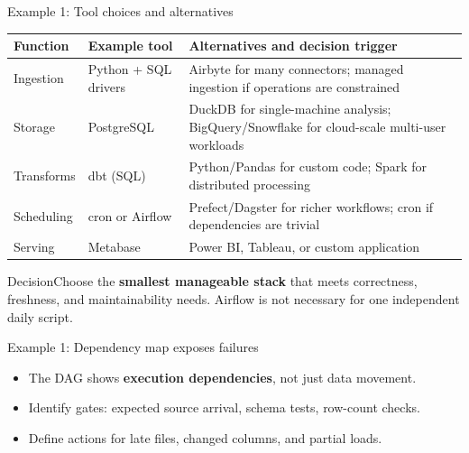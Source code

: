 \documentclass[aspectratio=43,10pt]{beamer}
\begin{document}
\begin{frame}{Example 1: Tool choices and alternatives}
\small
\begin{tabularx}{\textwidth}{@{}p{2.1cm}p{3.0cm}X@{}}\toprule
Function & Example tool & Alternatives and decision trigger \\ \midrule
Ingestion & Python + SQL drivers & Airbyte for many connectors; managed ingestion if operations are constrained \\
Storage & PostgreSQL & DuckDB for single-machine analysis; BigQuery/Snowflake for cloud-scale multi-user workloads \\
Transforms & dbt (SQL) & Python/Pandas for custom code; Spark for distributed processing \\
Scheduling & cron or Airflow & Prefect/Dagster for richer workflows; cron if dependencies are trivial \\
Serving & Metabase & Power BI, Tableau, or custom application \\
\bottomrule\end{tabularx}
\vspace{.6em}
\begin{block}{Decision}Choose the \textbf{smallest manageable stack} that meets correctness, freshness, and maintainability needs. Airflow is not necessary for one independent daily script.\end{block}
\end{frame}

\begin{frame}{Example 1: Dependency map exposes failures}
\centering
{}
\vspace{.5em}
\begin{itemize}
\item The DAG shows \textbf{execution dependencies}, not just data movement.
\item Identify gates: expected source arrival, schema tests, row-count checks.
\item Define actions for late files, changed columns, and partial loads.
\end{itemize}
\end{frame}
\end{document}
